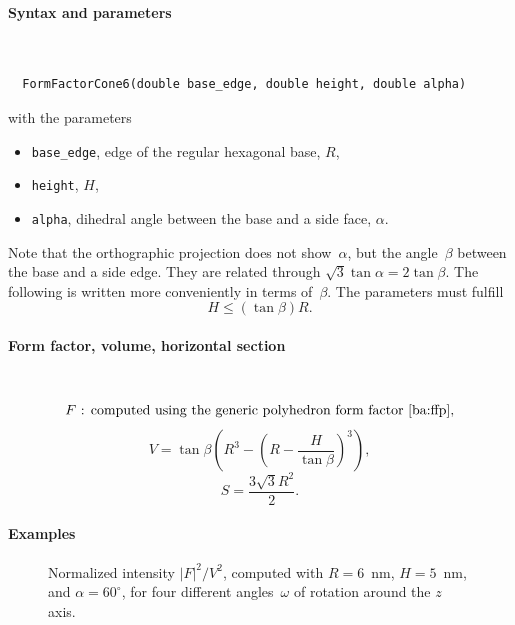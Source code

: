 \paragraph{Syntax and parameters}\strut\\[-2ex plus .2ex minus .2ex]
\begin{lstlisting}
  FormFactorCone6(double base_edge, double height, double alpha)
\end{lstlisting}
with the parameters
\begin{itemize}
\item \texttt{base\_edge}, edge of the regular hexagonal base, $R$,
\item \texttt{height}, $H$,
\item \texttt{alpha}, dihedral angle between the base and a side face, $\alpha$.
\end{itemize}
Note that the orthographic projection does not show~$\alpha$,
but the angle~$\beta$ between the base and a side edge.
They are related through $\sqrt{3}\tan \alpha = 2 \tan \beta$.
The following is written more conveniently in terms of~$\beta$.
The parameters must fulfill
\begin{displaymath}
  H \le (\tan\beta)R.
\end{displaymath}

\paragraph{Form factor, volume, horizontal section}\strut\\
\begin{equation*}
  F \text{~: computed using the generic polyhedron form factor~\cite{ba:ffp},}
\end{equation*}
\begin{equation*}
  V = \tan\beta  \left( R^3- \left(R-\frac{H}{\tan\beta}\right)^3 \right),
\end{equation*}
\begin{equation*}
  S =\dfrac{3\sqrt{3}R^2}{2}.
\end{equation*}

\paragraph{Examples}\strut

\begin{figure}[H]
\begin{center}
\end{center}
\caption{Normalized intensity $|F|^2/V^2$,
computed with $R=6$~nm, $H=5$~nm, and $\alpha=60^\circ$,
for four different angles~$\omega$ of rotation around the $z$ axis.}
\end{figure}

